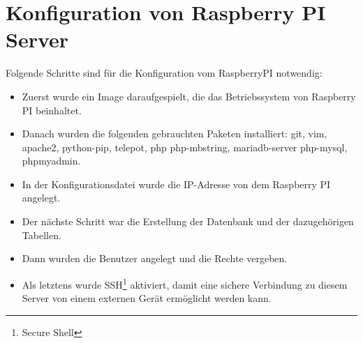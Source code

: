 \section{Konfiguration von Raspberry PI Server}
Folgende Schritte sind für die Konfiguration vom RaspberryPI notwendig: \\
\begin{itemize}
	\item Zuerst wurde ein Image daraufgespielt, die das Betriebssystem von Raspberry PI beinhaltet.
\end{itemize}
\begin{itemize}
	\item Danach wurden die folgenden gebrauchten Paketen installiert: git, vim, apache2, python-pip, telepot, php php-mbstring, mariadb-server php-mysql, phpmyadmin.
\end{itemize}
\begin{itemize}
	\item In der Konfigurationsdatei wurde die IP-Adresse von dem Raspberry PI angelegt.
\end{itemize}
\begin{itemize}
	\item Der nächste Schritt war die Erstellung der Datenbank und der dazugehörigen Tabellen.
\end{itemize}
\begin{itemize}
	\item Dann wurden die Benutzer angelegt und die Rechte vergeben.
\end{itemize}
\begin{itemize}
	\item Als letztens wurde SSH\footnote{Secure Shell} aktiviert, damit eine sichere Verbindung zu diesem Server von einem externen Gerät ermöglicht werden kann.
\end{itemize}
